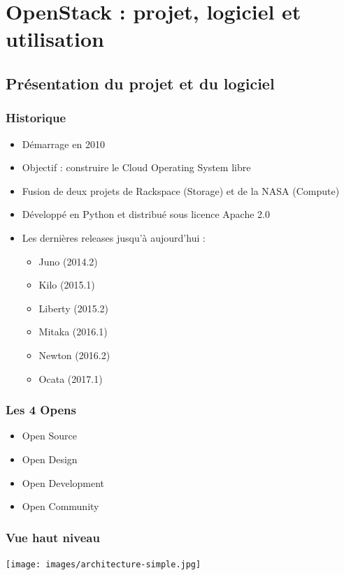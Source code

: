   \section[OpenStack]{OpenStack : projet, logiciel et utilisation}

  \subsection[OpenStack]{Présentation du projet et du logiciel}

  \begin{frame}
    \frametitle{Historique}
    \begin{itemize}
      \item Démarrage en 2010
      \item Objectif : construire le Cloud Operating System libre
      \item Fusion de deux projets de Rackspace (Storage) et de la NASA (Compute)
      \item Développé en Python et distribué sous licence Apache 2.0
      \item Les dernières releases jusqu'à aujourd'hui :
      \begin{itemize}
        \item Juno (2014.2)
        \item Kilo (2015.1)
        \item Liberty (2015.2)
        \item Mitaka (2016.1)
        \item Newton (2016.2)
        \item Ocata (2017.1)
      \end{itemize}
    \end{itemize}
  \end{frame}

  \begin{frame}
    \frametitle{Les 4 Opens}
    \begin{itemize}
      \item Open Source
      \item Open Design
      \item Open Development
      \item Open Community
    \end{itemize}
  \end{frame}

  \begin{frame}
    \frametitle{Vue haut niveau}
    \texttt{[image: images/architecture-simple.jpg]}
  \end{frame}

